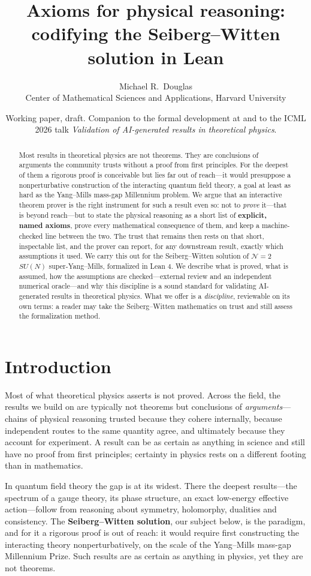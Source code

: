 \documentclass[11pt]{article}
\title{Axioms for physical reasoning:\\ codifying the Seiberg--Witten solution in Lean}
\author{Michael R.\ Douglas\\[2pt]
  \small Center of Mathematical Sciences and Applications, Harvard University}
\date{\small Working paper, draft. Companion to the formal development at
  \href{https://github.com/mrdouglasny/seiberg-witten}{\code{mrdouglasny/seiberg-witten}}
  and to the ICML 2026 talk \emph{Validation of AI-generated results in theoretical physics}.}
\begin{document}
\maketitle

\begin{abstract}
Most results in theoretical physics are not theorems. They are conclusions of arguments the
community trusts without a proof from first principles. For the deepest of them a rigorous
proof is conceivable but lies far out of reach---it would presuppose a nonperturbative
construction of the interacting quantum field theory, a goal at least as hard as the
Yang--Mills mass-gap Millennium problem. We argue that an interactive theorem prover is the
right instrument for such a result even so: not to \emph{prove} it---that is beyond
reach---but to state the physical reasoning as a short list of \textbf{explicit, named
axioms}, prove every mathematical consequence of them, and keep a machine-checked line between
the two. The trust that remains then rests on that short, inspectable list, and the prover can
report, for any downstream result, exactly which assumptions it used. We carry this out for
the Seiberg--Witten solution of $\mathcal{N}=2$ $SU(N)$ super-Yang--Mills, formalized in Lean
4. We describe what is proved, what is assumed, how the assumptions are checked---external
review and an independent numerical oracle---and why this discipline is a sound standard for
validating AI-generated results in theoretical physics. What we offer is a \emph{discipline},
reviewable on its own terms: a reader may take the Seiberg--Witten mathematics on trust and
still assess the formalization method.
\end{abstract}

\section{Introduction}

Most of what theoretical physics asserts is not proved. Across the field, the results we build on
are typically not theorems but conclusions of \emph{arguments}---chains of physical reasoning
trusted because they cohere internally, because independent routes to the same quantity agree, and
ultimately because they account for experiment. A result can be as certain as anything in science
and still have no proof from first principles; certainty in physics rests on a different footing
than in mathematics.

In quantum field theory the gap is at its widest. There the deepest results---the spectrum of a
gauge theory, its phase structure, an exact low-energy effective action---follow from reasoning
about symmetry, holomorphy, dualities and consistency. The \textbf{Seiberg--Witten solution}, our
subject below, is the paradigm, and for it a rigorous proof is out of reach: it would require first
constructing the interacting theory nonperturbatively, on the scale of the Yang--Mills mass-gap
Millennium Prize. Such results are as certain as anything in physics, yet they are not theorems.
\end{document}
